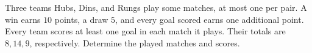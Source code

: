Three teams Hubs, Dins, and Rungs play some matches, at most one per pair. A win earns $10$ points, a draw $5$, and every goal scored earns one additional point. Every team scores at least one goal in each match it plays. Their totals are $8,14,9$, respectively. Determine the played matches and scores.
